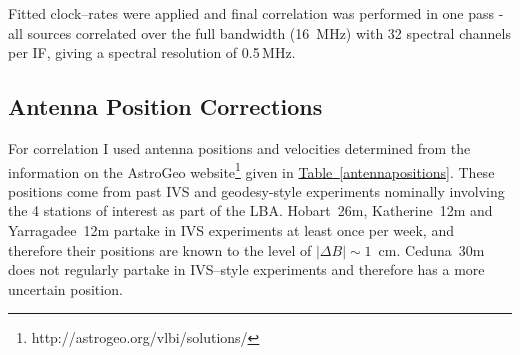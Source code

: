 		Fitted clock--rates were applied and final correlation was performed in one pass - all sources correlated over the full bandwidth (16~MHz) with 32 spectral channels per IF, giving a spectral resolution of 0.5\,MHz.
	    	    

		\subsection{Antenna Position Corrections}
			For correlation I used antenna positions and velocities determined from the information on the AstroGeo website\footnote{http://astrogeo.org/vlbi/solutions/} given in \hyperref[antennapositions]{Table~\ref*{antennapositions}}. These positions come from past IVS and geodesy-style experiments nominally involving the 4 stations of interest as part of the LBA. Hobart~26m, Katherine~12m and Yarragadee~12m partake in IVS experiments at least once per week, and therefore their positions are known to the level of $|\Delta B|\sim1$~cm. Ceduna~30m does not regularly partake in IVS--style experiments and therefore has a more uncertain position.
